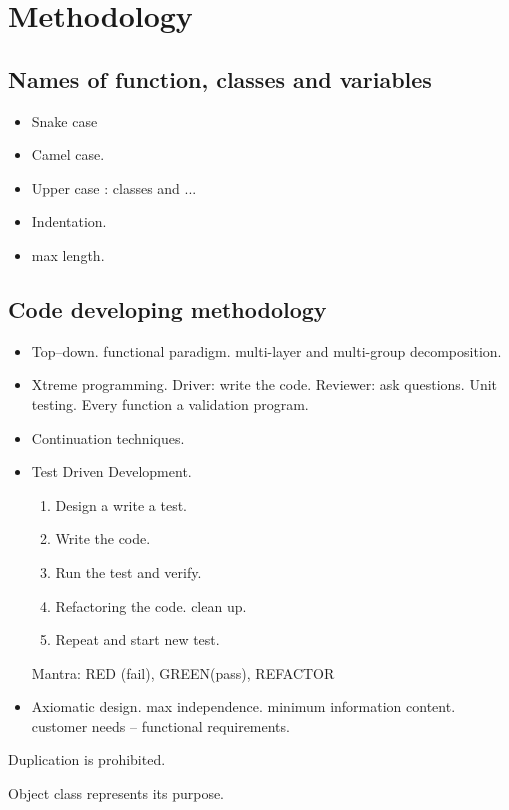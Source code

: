 \newpage
\section{Methodology}

\subsection{Names of function, classes and variables} 
\begin{itemize} 
	\item Snake case
	
	\item Camel case. 
	
	
	\item Upper case : classes and ... 
	
	\item Indentation.   
	
	
	\item max length. 
	
	
\end{itemize}


\subsection{Code developing methodology} 
\begin{itemize} 
	\item Top--down. functional paradigm. multi-layer and multi-group decomposition. 
	
	\item Xtreme programming. Driver: write the code. Reviewer: ask questions. Unit testing. 
	      Every function a validation program. 
	
	\item Continuation techniques. 
	
	\item Test Driven Development.  
	   \begin{enumerate}
	   	 \item Design a write a test. 
	   	 \item Write the code. 
	   	 \item Run the test and verify. 
	   	 \item Refactoring the code. clean up. 
	   	 \item Repeat and start new test.  
	   	\end{enumerate} 
   	Mantra: RED (fail), GREEN(pass), REFACTOR 
	
	\item Axiomatic design. max independence. minimum information content. customer needs -- functional requirements. 
	

\end{itemize} 

Duplication is prohibited. 

Object class represents its purpose. 



 
 
 
 
 


